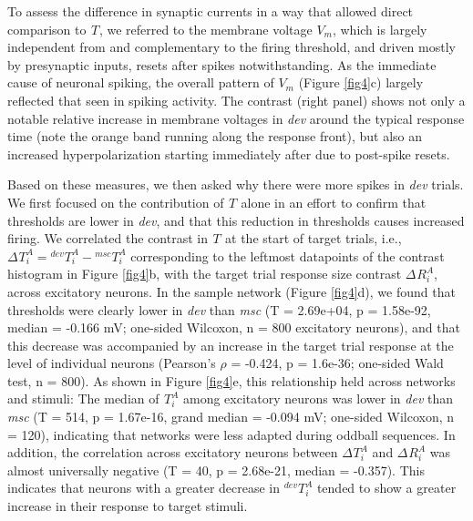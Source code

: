 \documentclass[pdflatex,referee,iicol,sn-basic]{sn-jnl}
\newcommand{\dev}{\textit{dev}}
\newcommand{\msc}{\textit{msc}}
\renewcommand{\R}[3][]{{}^{#1}_{}\!R^{#2}_{#3}}
\renewcommand{\T}[3][]{{}^{#1}_{}T^{#2}_{#3}}
\theoremstyle{thmstyleone}%
\theoremstyle{thmstyletwo}%
\theoremstyle{thmstylethree}%
\begin{document}
To assess the difference in synaptic currents in a way that allowed direct comparison to $\T{}{}$, we referred to the membrane voltage $V_m$, which is largely independent from and complementary to the firing threshold, and driven mostly by presynaptic inputs, resets after spikes notwithstanding. As the immediate cause of neuronal spiking, the overall pattern of $V_m$ (Figure \ref{fig4}c) largely reflected that seen in spiking activity. The contrast (right panel) shows not only a notable relative increase in membrane voltages in \dev{} around the typical response time (note the orange band running along the response front), but also an increased hyperpolarization starting immediately after due to post-spike resets.

Based on these measures, we then asked why there were more spikes in \dev{} trials. We first focused on the contribution of $\T{}{}$ alone in an effort to confirm that thresholds are lower in \dev{}, and that this reduction in thresholds causes increased firing. We correlated the contrast in $\T{}{}$ at the start of target trials, i.e., $\Delta \T{A}{i} = \T[dev]{A}{i} - \T[msc]{A}{i}$ corresponding to the leftmost datapoints of the contrast histogram in Figure \ref{fig4}b, with the target trial response size contrast $\Delta \R{A}{i}$, across excitatory neurons. In the sample network (Figure \ref{fig4}d), we found that thresholds were clearly lower in \dev{} than \msc{} (T = 2.69e+04, p = 1.58e-92, median = -0.166 mV; one-sided Wilcoxon, n = 800 excitatory neurons), and that this decrease was accompanied by an increase in the target trial response at the level of individual neurons (Pearson's $\rho$ = -0.424, p = 1.6e-36; one-sided Wald test, n = 800). As shown in Figure \ref{fig4}e, this relationship held across networks and stimuli: The median of $\T{A}{i}$ among excitatory neurons was lower in \dev{} than \msc{} (T = 514, p = 1.67e-16, grand median = -0.094 mV; one-sided Wilcoxon, n = 120), indicating that networks were less adapted during oddball sequences. In addition, the correlation across excitatory neurons between $\Delta \T{A}{i}$ and $\Delta \R{A}{i}$ was almost universally negative (T = 40, p = 2.68e-21, median = -0.357). This indicates that neurons with a greater decrease in $\T[dev]{A}{i}$ tended to show a greater increase in their response to target stimuli.
\end{document}
